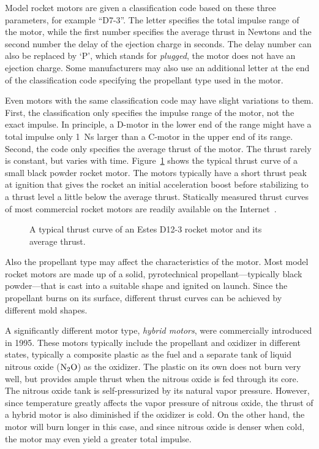 Model rocket motors are given a classification code based on these
three parameters, for example ``D7-3''.  The letter specifies the
total impulse range of the motor, while the first number specifies the
average thrust in Newtons and the second number the delay of the
ejection charge in seconds.  The delay number can also be replaced by
`P', which stands for {\it plugged}, \ie the motor does not have an
ejection charge.  Some manufacturers may also use an additional letter
at the end of the classification code specifying the
propellant type used in the motor.

Even motors with the same classification code may have slight
variations to them.  First, the classification only specifies the
impulse range of the motor, not the exact impulse.  In principle, a
D-motor in the lower end of the range might have a total impulse only
1~Ns larger than a C-motor in the upper end of its range.  Second,
the code only specifies the average thrust of the motor.  The thrust
rarely is constant, but varies with time.
Figure~\ref{fig-thrust-curve} shows the typical thrust curve of a
small black powder rocket motor.  The motors typically have a short
thrust peak at ignition that gives the rocket an initial acceleration
boost before stabilizing to a thrust level a little below the average
thrust.  Statically measured thrust curves of most commercial rocket
motors are readily available on the
Internet~\cite{thrust-curve-database}.

\begin{figure}
\centering
{}
\caption{A typical thrust curve of an Estes D12-3 rocket motor and
  its average thrust.~\cite{D12-curve}}
\label{fig-thrust-curve}
\end{figure}

Also the propellant type may affect the characteristics of the motor.
Most model rocket motors are made up of a solid, pyrotechnical
propellant---typically black powder---that is cast into a suitable
shape and ignited on launch.  Since the propellant burns on its
surface, different thrust curves can be achieved by different mold
shapes.


A significantly different motor type, {\it hybrid motors}, were
commercially introduced in 1995.  These motors typically include the
propellant and oxidizer in different states, typically a composite
plastic as the fuel and a separate tank of liquid nitrous oxide 
($\rm N_2O$) as the oxidizer.  The plastic on its own does not 
burn very well, but provides ample thrust when the nitrous oxide is
fed through its core.  The nitrous oxide tank is
self-pressurized by its natural vapor pressure. However, since
temperature greatly affects the vapor pressure of nitrous oxide, the
thrust of a hybrid motor is also diminished if the oxidizer is cold.
On the other hand, the motor will burn longer in this case, and since
nitrous oxide is denser when cold, the motor may even yield a greater
total impulse.

